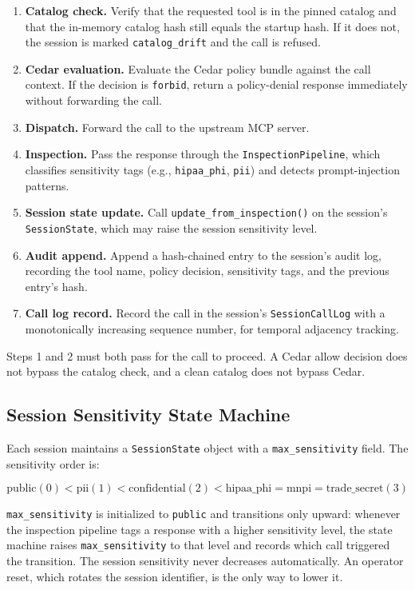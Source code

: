 \begin{enumerate}[leftmargin=1.5em]
  \item \textbf{Catalog check.} Verify that the requested tool is in the pinned catalog and
    that the in-memory catalog hash still equals the startup hash. If it does not, the
    session is marked \texttt{catalog\_drift} and the call is refused.
  \item \textbf{Cedar evaluation.} Evaluate the Cedar policy bundle against the call
    context. If the decision is \texttt{forbid}, return a policy-denial response immediately
    without forwarding the call.
  \item \textbf{Dispatch.} Forward the call to the upstream MCP server.
  \item \textbf{Inspection.} Pass the response through the \texttt{InspectionPipeline},
    which classifies sensitivity tags (e.g., \texttt{hipaa\_phi}, \texttt{pii}) and detects
    prompt-injection patterns.
  \item \textbf{Session state update.} Call \texttt{update\_from\_inspection()} on the
    session's \texttt{SessionState}, which may raise the session sensitivity level.
  \item \textbf{Audit append.} Append a hash-chained entry to the session's audit log,
    recording the tool name, policy decision, sensitivity tags, and the previous entry's
    hash.
  \item \textbf{Call log record.} Record the call in the session's \texttt{SessionCallLog}
    with a monotonically increasing sequence number, for temporal adjacency tracking.
\end{enumerate}

Steps 1 and 2 must both pass for the call to proceed. A Cedar allow decision does not
bypass the catalog check, and a clean catalog does not bypass Cedar.

\subsection{Session Sensitivity State Machine}

Each session maintains a \texttt{SessionState} object with a \texttt{max\_sensitivity}
field. The sensitivity order is:

\[
  \text{public}(0) < \text{pii}(1) < \text{confidential}(2) < \text{hipaa\_phi} = \text{mnpi} = \text{trade\_secret}(3)
\]

\texttt{max\_sensitivity} is initialized to \texttt{public} and transitions only upward:
whenever the inspection pipeline tags a response with a higher sensitivity level, the state
machine raises \texttt{max\_sensitivity} to that level and records which call triggered the
transition. The session sensitivity never decreases automatically. An operator reset, which
rotates the session identifier, is the only way to lower it.

